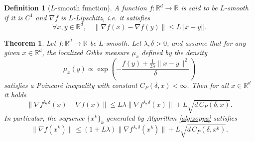\documentclass{article}
\newtheorem{theorem}{Theorem}
\newtheorem{definition}{Definition}
\newcommand{\R}{\mathbb{R}}
\begin{document}
\begin{definition}[$L$-smooth function]
    A function $f:\R^d\to \R$ is said to be $L$-smooth if it is $C^1$ and $\nabla f$ is $L$-Lipschitz, i.e. it satisfies
    \[\forall x, y \in \R^d, \quad \|\nabla f(x) - \nabla f(y)\|\leq L||x-y||.\]
\end{definition}

\begin{theorem}\label{thm:quasi_min_general}
Let $f:\mathbb{R}^d\to \mathbb{R}$ be $L$-smooth. Let $\lambda, \delta > 0$, and assume that for any given $x \in \mathbb{R}^d$, the localized Gibbs measure $\mu_x$ defined by the density
$$ \mu_x(y) \propto \exp\left(-\frac{f(y) + \frac{1}{2\lambda}\|x-y\|^2}{\delta}\right) $$
satisfies a Poincaré inequality with constant $C_P(\delta, x) < \infty$. Then for all $x\in \R^d$ it holds
$$ \|\nabla f^{\lambda,\delta}(x)-\nabla f(x)\| \leq L\lambda \|\nabla f^{\lambda,\delta}(x)\| + L\sqrt{d\,C_P(\delta, x)} . $$
In particular, the sequence $\{x^k\}_k$ generated by Algorithm \ref{alg:zoppa} satisfies
$$ \|\nabla f(x^k)\| \leq (1+L\lambda)\|\nabla f^{\lambda, \delta}(x^k)\|+L\sqrt{d \, C_P(\delta, x^k)}.$$
\end{theorem}
\end{document}
